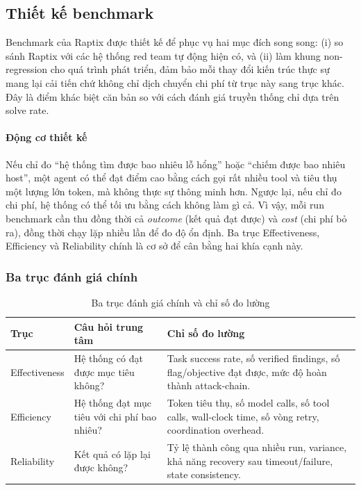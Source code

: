 
\subsection{Thiết kế benchmark}
\label{sec:thiet-ke-benchmark}

Benchmark của Raptix được thiết kế để phục vụ hai mục đích song song: (i) so sánh Raptix với các hệ thống red team tự động hiện có, và (ii) làm khung non-regression cho quá trình phát triển, đảm bảo mỗi thay đổi kiến trúc thực sự mang lại cải tiến chứ không chỉ dịch chuyển chi phí từ trục này sang trục khác. Đây là điểm khác biệt căn bản so với cách đánh giá truyền thống chỉ dựa trên solve rate.

\paragraph{Động cơ thiết kế}

Nếu chỉ đo ``hệ thống tìm được bao nhiêu lỗ hổng'' hoặc ``chiếm được bao nhiêu host'', một agent có thể đạt điểm cao bằng cách gọi rất nhiều tool và tiêu thụ một lượng lớn token, mà không thực sự thông minh hơn. Ngược lại, nếu chỉ đo chi phí, hệ thống có thể tối ưu bằng cách không làm gì cả. Vì vậy, mỗi run benchmark cần thu đồng thời cả \emph{outcome} (kết quả đạt được) và \emph{cost} (chi phí bỏ ra), đồng thời chạy lặp nhiều lần để đo độ ổn định. Ba trục Effectiveness, Efficiency và Reliability chính là cơ sở để cân bằng hai khía cạnh này.

\subsubsection*{Ba trục đánh giá chính}

\begin{table}[H]
\centering
\caption{Ba trục đánh giá chính và chỉ số đo lường}
\label{tab:ba-truc-danh-gia}
\small
\renewcommand{\arraystretch}{1.3}
\begin{tabular}{|p{2.8cm}|p{6cm}|p{6.5cm}|}
\hline
\textbf{Trục} & \textbf{Câu hỏi trung tâm} & \textbf{Chỉ số đo lường} \\
\hline
Effectiveness & Hệ thống có đạt được mục tiêu không? & Task success rate, số verified findings, số flag/objective đạt được, mức độ hoàn thành attack-chain. \\
\hline
Efficiency & Hệ thống đạt mục tiêu với chi phí bao nhiêu? & Token tiêu thụ, số model calls, số tool calls, wall-clock time, số vòng retry, coordination overhead. \\
\hline
Reliability & Kết quả có lặp lại được không? & Tỷ lệ thành công qua nhiều run, variance, khả năng recovery sau timeout/failure, state consistency. \\
\hline
\end{tabular}
\end{table}

